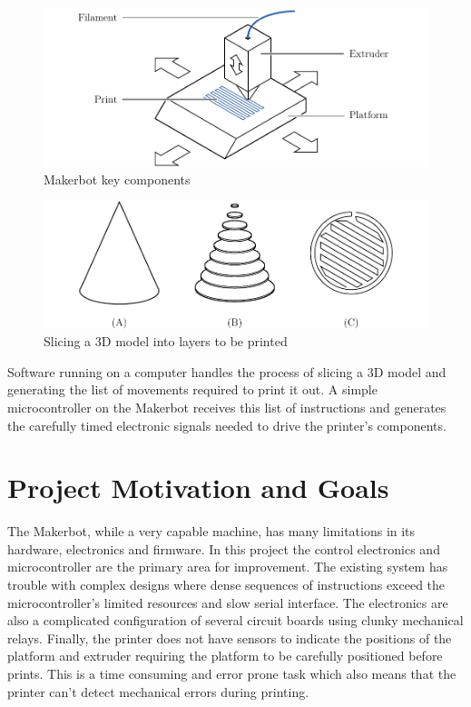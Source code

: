 		\begin{figure}
			\includegraphics[width=1\textwidth]{diagrams/printerBasics.pdf}
			\caption{Makerbot key components}
			\label{fig:printerBasics}
		\end{figure}
		
		\begin{figure}
			\includegraphics[width=1\textwidth]{diagrams/slicing.pdf}
			\caption{Slicing a 3D model into layers to be printed}
			\label{fig:slicing}
		\end{figure}
		
		Software running on a computer handles the process of slicing a 3D model and
		generating the list of movements required to print it out.  A simple
		microcontroller on the Makerbot receives this list of instructions and
		generates the carefully timed electronic signals needed to drive the
		printer's components.
		
	\section{Project Motivation and Goals}
		
		\label{sec:aims}
		
		The Makerbot, while a very capable machine, has many limitations in its
		hardware, electronics and firmware. In this project the control electronics
		and microcontroller are the primary area for improvement. The existing
		system has trouble with complex designs where dense sequences of
		instructions exceed the microcontroller's limited resources and slow serial
		interface. The electronics are also a complicated configuration of several
		circuit boards using clunky mechanical relays.  Finally, the printer does
		not have sensors to indicate the positions of the platform and extruder
		requiring the platform to be carefully positioned before prints. This is a
		time consuming and error prone task which also means that the printer can't
		detect mechanical errors during printing.
		
